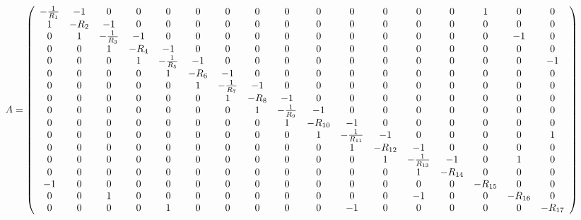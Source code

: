 \documentclass[10pt,a4paper]{article}
\begin{document}
\begin{landscape}
\begin{equation}\label{eq:A}
A =\left(\begin{array}{c c c c c c c c c c c c c c c c c c}
-\frac{1}{R_1} & -1 & 0 & 0 & 0 & 0 & 0 & 0 & 0 & 0 & 0 & 0 & 0 & 0 & 1 & 0 & 0\\
1 & -R_2 & -1 & 0 & 0& 0 & 0 & 0& 0 & 0 & 0 & 0 & 0 & 0 & 0 & 0 & 0\\
0 & 1 & -\frac{1}{R_3} & -1 & 0 & 0 & 0 & 0 & 0 & 0 & 0 & 0 & 0 & 0 & 0 &-1 & 0  \\
0 & 0 & 1 & -R_4 & -1 & 0 & 0 & 0 & 0 & 0 & 0 & 0 &0 & 0& 0& 0& 0\\
0& 0 & 0 & 1 & -\frac{1}{R_5} & -1 & 0 & 0 & 0 & 0 & 0 & 0 & 0 &0 & 0& 0& -1\\
0& 0 & 0 & 0 & 1& -R_6 & -1 & 0 & 0 & 0 & 0 & 0 & 0 & 0 &0 & 0& 0\\
0& 0 & 0 & 0 & 0 & 1& -\frac{1}{R_7} & -1 & 0 & 0 & 0 & 0 & 0 & 0 & 0 &0 & 0\\
0& 0 & 0 & 0 & 0 & 0& 1& -{R_8} & -1  & 0 & 0 & 0 & 0 & 0 & 0 &0 & 0\\
0& 0 & 0 & 0 & 0 & 0& 0& 1& -\frac{1}{R_9} & -1  & 0 & 0 & 0 & 0 & 0 &0 & 0\\
0& 0 & 0 & 0 & 0 & 0& 0& 0& 1& -{R_{10}} & -1  & 0 & 0 & 0 & 0 &0 & 0\\
0& 0 & 0 & 0 & 0 & 0& 0& 0& 0 & 1& -\frac{1}{R_{11}} & -1  & 0 & 0 & 0 & 0 &1 \\
0& 0 & 0 & 0 & 0 & 0& 0& 0& 0 & 0& 1& -{R_{12}} & -1  & 0 & 0 & 0 & 0 \\
0& 0 & 0 & 0 & 0 & 0& 0& 0& 0 & 0& 0& 1& -\frac{1}{R_{13}} & -1  & 0 & 1 & 0 \\
0& 0 & 0 & 0 & 0 & 0& 0& 0& 0 & 0& 0& 0& 1& -{R_{14}} & 0 & 0 & 0 \\
-1& 0 & 0 & 0 & 0 & 0& 0& 0& 0 & 0& 0& 0& 0& 0& -{R_{15}} & 0 & 0 \\
0& 0 & 1 & 0 & 0 & 0& 0& 0& 0 & 0& 0& 0& -1& 0& 0& -{R_{16}} & 0 \\
0& 0 & 0 & 0 & 1 & 0& 0& 0& 0 & 0& -1& 0& 0& 0& 0& 0& -{R_{17}} \\
\end{array}\right)
\end{equation}


\end{landscape}
\end{document}

